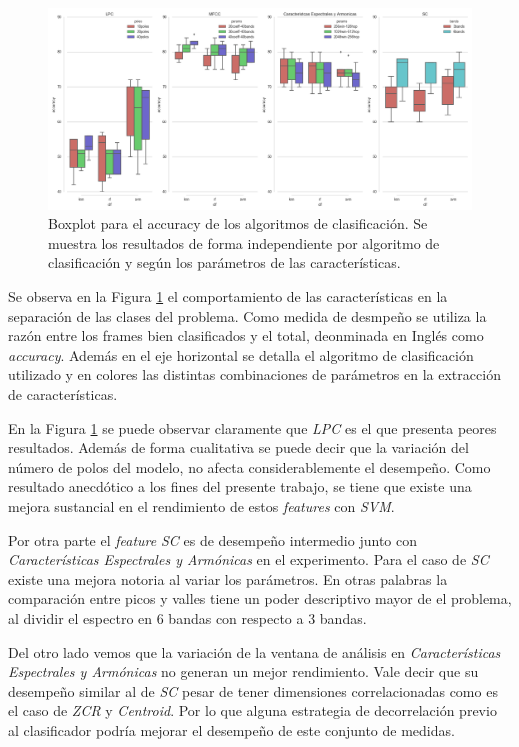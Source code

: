 \documentclass{article}
\begin{document}
\begin{figure}[H]
\begin{center}
\includegraphics[width=1\textwidth]{exp1_comparacion} 
\caption{Boxplot para el accuracy de los algoritmos de clasificación. Se muestra los resultados de forma independiente por algoritmo de clasificación y según los parámetros de las características.}
\label{fig:exp1_comparacion}
\end{center}
\end{figure}

Se observa en la Figura \ref{fig:exp1_comparacion} el comportamiento de las características en la separación de las clases del problema. Como medida de desmpeño se utiliza la razón entre los frames bien clasificados y el total, deonminada en Inglés como \textit{accuracy}. Además en el eje horizontal se detalla el algoritmo de clasificación utilizado y en colores las distintas combinaciones de parámetros en la extracción de características. 
\medskip

En la Figura \ref{fig:exp1_comparacion} se puede observar claramente que \textit{LPC} es el que presenta peores resultados. Además de forma cualitativa se puede decir que la variación del número de polos del modelo, no afecta considerablemente el desempeño. Como resultado anecdótico a los fines del presente trabajo, se tiene que existe una mejora sustancial en el rendimiento de estos \textit{features} con \textit{SVM}.
\medskip

Por otra parte el \textit{feature} \textit{SC} es de desempeño intermedio junto con \textit{Características Espectrales y Armónicas} en el experimento. Para el caso de \textit{SC} existe una mejora notoria al variar los parámetros. En otras palabras la comparación entre picos y valles tiene un poder descriptivo mayor de el problema, al dividir el espectro en 6 bandas con respecto a 3 bandas.  
\medskip

Del otro lado vemos que la variación de la ventana de análisis en \textit{Características Espectrales y Armónicas} no generan un mejor rendimiento. Vale decir que su desempeño similar al de \textit{SC} pesar de tener dimensiones correlacionadas como es el caso de \textit{ZCR} y \textit{Centroid}. Por lo que alguna estrategia de decorrelación previo al clasificador podría mejorar el desempeño de este conjunto de medidas.
\medskip 
\end{document}
